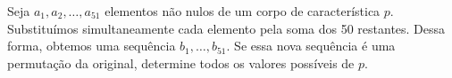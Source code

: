 Seja \(a_1, a_2,\dots,a_{51}\) elementos não nulos de um corpo de característica \(p\). Substituímos simultaneamente cada elemento pela soma dos 50 restantes. Dessa forma, obtemos uma sequência \(b_1, \dots , b_{51}\). Se essa nova sequência é uma permutação da original, determine todos os valores possíveis de \(p\).
